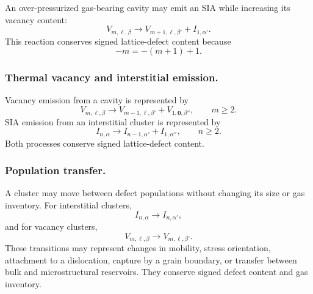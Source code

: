 An over-pressurized gas-bearing cavity may emit an SIA while increasing its
vacancy content:
\begin{equation}
    V_{m,\boldsymbol{\ell},\beta}
    \longrightarrow
    V_{m+1,\boldsymbol{\ell},\beta'}
    +
    I_{1,\alpha'} .
    \label{eq:trap_mutation_general}
\end{equation}
This reaction conserves signed lattice-defect content because
\begin{equation}
    -m = -(m+1)+1 .
\end{equation}

\subsubsection*{Thermal vacancy and interstitial emission.}

Vacancy emission from a cavity is represented by
\begin{equation}
    V_{m,\boldsymbol{\ell},\beta}
    \longrightarrow
    V_{m-1,\boldsymbol{\ell},\beta'}
    +
    V_{1,\mathbf{0},\beta''},
    \qquad
    m\geq 2 .
    \label{eq:vacancy_emission_general}
\end{equation}
SIA emission from an interstitial cluster is represented by
\begin{equation}
    I_{n,\alpha}
    \longrightarrow
    I_{n-1,\alpha'}+I_{1,\alpha''},
    \qquad
    n\geq 2 .
    \label{eq:SIA_emission_general}
\end{equation}
Both processes conserve signed lattice-defect content.

\subsubsection*{Population transfer.}

A cluster may move between defect populations without changing its size or gas
inventory. For interstitial clusters,
\begin{equation}
    I_{n,\alpha}
    \longrightarrow
    I_{n,\alpha'},
    \label{eq:I_population_transfer}
\end{equation}
and for vacancy clusters,
\begin{equation}
    V_{m,\boldsymbol{\ell},\beta}
    \longrightarrow
    V_{m,\boldsymbol{\ell},\beta'} .
    \label{eq:V_population_transfer}
\end{equation}
These transitions may represent changes in mobility, stress orientation,
attachment to a dislocation, capture by a grain boundary, or transfer between
bulk and microstructural reservoirs. They conserve signed defect content and
gas inventory.


